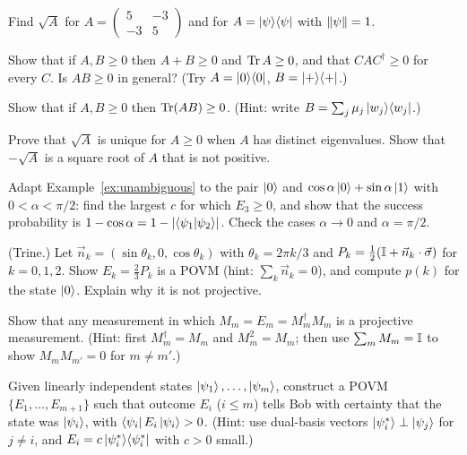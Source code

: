 \begin{exerciseset}
   Find $\sqrt A$ for $A=\begin{pmatrix}5&-3\\-3&5\end{pmatrix}$ and for $A=\left|\psi\right\rangle\!\left\langle\psi\right|$ with $\left\|\psi\right\|=1$.

   Show that if $A,B\ge0$ then $A+B\ge0$ and $\operatorname{Tr} A\ge0$, and that $CAC^\dagger\ge0$ for every $C$. Is $AB\ge0$ in general? (Try $A=\left|0\right\rangle\!\left\langle0\right|$, $B=\left|+\right\rangle\!\left\langle+\right|$.)

   Show that if $A,B\ge0$ then $\operatorname{Tr}(AB)\ge0$. (Hint: write $B=\sum_j\mu_j\left|w_j\right\rangle\!\left\langle w_j\right|$.)

   Prove that $\sqrt{A}$ is unique for $A\ge0$ when $A$ has distinct eigenvalues. Show that $-\sqrt A$ is a square root of $A$ that is not positive.

   Adapt Example~\ref{ex:unambiguous} to the pair $\left|0\right\rangle$ and $\cos\alpha\left|0\right\rangle+\sin\alpha\left|1\right\rangle$ with $0<\alpha<\pi/2$: find the largest $c$ for which $E_3\ge0$, and show that the success probability is $1-\cos\alpha=1-\left|\left\langle\psi_1\middle|\psi_2\right\rangle\right|$. Check the cases $\alpha\to0$ and $\alpha=\pi/2$.

  \label{ex:trine} (Trine.) Let $\vec n_k=(\sin\theta_k,0,\cos\theta_k)$ with $\theta_k=2\pi k/3$ and $P_k=\frac12(\mathbb{I}+\vec n_k\cdot\vec\sigma)$ for $k=0,1,2$. Show $E_k=\frac23P_k$ is a POVM (hint: $\sum_k\vec n_k=0$), and compute $p(k)$ for the state $\left|0\right\rangle$. Explain why it is not projective.

   Show that any measurement in which $M_m=E_m=M_m^\dagger M_m$ is a projective measurement. (Hint: first $M_m^\dagger=M_m$ and $M_m^2=M_m$; then use $\sum_mM_m=\mathbb{I}$ to show $M_mM_{m'}=0$ for $m\neq m'$.)

   Given linearly independent states $\left|\psi_1\right\rangle,\dots,\left|\psi_m\right\rangle$, construct a POVM $\{E_1,\dots,E_{m+1}\}$ such that outcome $E_i$ ($i\le m$) tells Bob with certainty that the state was $\left|\psi_i\right\rangle$, with $\left\langle\psi_i\right|E_i\left|\psi_i\right\rangle>0$. (Hint: use dual-basis vectors $\left|\psi_i^*\right\rangle\perp\left|\psi_j\right\rangle$ for $j\neq i$, and $E_i=c\left|\psi_i^*\right\rangle\!\left\langle\psi_i^*\right|$ with $c>0$ small.)
\end{exerciseset}
